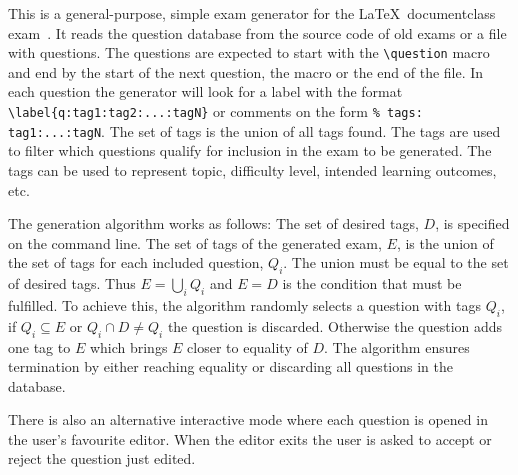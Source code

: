 This is a general-purpose, simple exam generator for the \LaTeX\ documentclass 
exam~\cite{exam}.
It reads the question database from the source code of old exams or a file with 
questions.
The questions are expected to start with the \verb'\question' macro and end by 
the start of the next question, the \verb'' macro or the end of 
the file.
In each question the generator will look for a label with the format 
\verb'\label{q:tag1:tag2:...:tagN}' or comments on the form
\verb'% tags: tag1:...:tagN'.
The set of tags is the union of all tags found.
The tags are used to filter which questions qualify for inclusion in the exam 
to be generated.
The tags can be used to represent topic, difficulty level, intended learning 
outcomes, etc.

The generation algorithm works as follows:
The set of desired tags, \(D\), is specified on the command line.
The set of tags of the generated exam, \(E\), is the union of the set of tags 
for each included question, \(Q_i\).
The union must be equal to the set of desired tags.
Thus \(E = \bigcup_i Q_i\) and \(E = D\) is the condition that must be 
fulfilled.
To achieve this, the algorithm randomly selects a question with tags \(Q_i\), 
if \(Q_i\subseteq E\) or \(Q_i\cap D\neq Q_i\) the question is discarded.
Otherwise the question adds one tag to \(E\) which brings \(E\) closer to 
equality of \(D\).
The algorithm ensures termination by either reaching equality or discarding all
questions in the database.

There is also an alternative interactive mode where each question is opened in 
the user's favourite editor.
When the editor exits the user is asked to accept or reject the question just 
edited.

